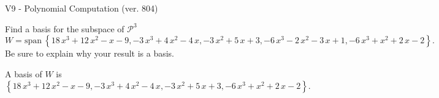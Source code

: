 \begin{exercise}
  \begin{exerciseTitle}V9 - Polynomial Computation (ver. 804)\end{exerciseTitle}
  \begin{exerciseStatement}
    Find a basis for the subspace of \(\mathcal{P}^3\) 
\[W=\mathrm{span}\ \left\{18 \, x^{3} + 12 \, x^{2} - x - 9 , -3 \, x^{3} + 4 \, x^{2} - 4 \, x , -3 \, x^{2} + 5 \, x + 3 , -6 \, x^{3} - 2 \, x^{2} - 3 \, x + 1 , -6 \, x^{3} + x^{2} + 2 \, x - 2\right\}.\]
 Be sure to explain why your result is a basis.


  \end{exerciseStatement}
  \begin{exerciseAnswer}
   A basis of \(W\) is  \(\left\{18 \, x^{3} + 12 \, x^{2} - x - 9 , -3 \, x^{3} + 4 \, x^{2} - 4 \, x , -3 \, x^{2} + 5 \, x + 3 , -6 \, x^{3} + x^{2} + 2 \, x - 2\right\}\).
  


  \end{exerciseAnswer}
\end{exercise}